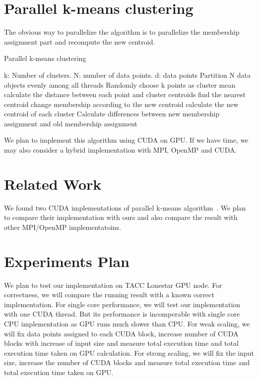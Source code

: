 \documentclass{article}
\begin{document}
\section{Parallel k-means clustering}
The obvious way to parallelize the algorithm is to parallelize the
membership assignment part and recompute the new centroid. 
\begin{algorithm}
  \caption{Parallel k-means clustering} \label{par}
  \begin{algorithmic}[1]
    \INPUT k: Number of clusters. N: number of data points. d: data points
     \label{alg:p}
    \State Partition N data objects evenly among all threads
    \State Randomly choose k points as cluster mean
    \State calculate the distance between each point and
    cluster centroids
    \State find the nearest centroid
    \State change membership according to the new centroid
    \State calculate the new centroid of each cluster
    \EndParFor
    \State Calculate differences between new membership assignment and
    old membership assignment
    \EndWhile
    \EndFunction  
  \end{algorithmic}
\end{algorithm}

We plan to implement this algorithm using CUDA on GPU. If we have
time, we may also consider a hybrid implementation with MPI, OpenMP
and CUDA. 

\section{Related Work}
We found two CUDA implementations of parallel k-means
algorithm~\cite{serban-kmeans, gpuminer}. We plan to compare their
implementation with ours and also compare the result with other
MPI/OpenMP implementatoins.  

\section{Experiments Plan}
We plan to test our implementation on TACC Lonestar GPU node. For correctness,
we will compare the running result with a known correct
implementation. For single core performance, we will test our
implementation with one CUDA thread. But its performance is
incomperable with single core CPU implementation as GPU runs much
slower than CPU. For weak scaling, we will fix data points assigned to
each CUDA block, increase number of CUDA blocks with increase of
input size and measure total execution time and total execution time taken
on GPU calculation. For strong scaling, we will fix the input size,
increase the number of CUDA blocks and measure total execution
time and total execution time taken on GPU. 



\end{document}
